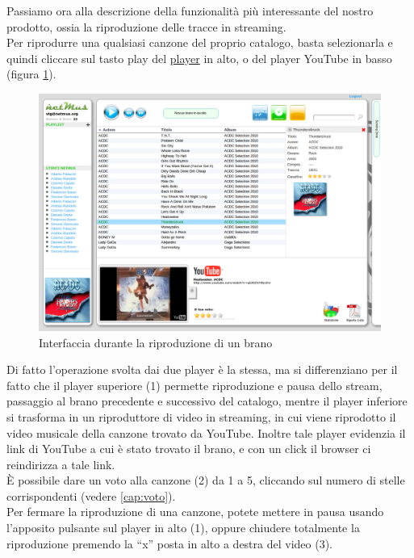 Passiamo ora alla descrizione della funzionalit\`a pi\`u
interessante del nostro prodotto, ossia la riproduzione delle tracce in streaming.\\
Per riprodurre una qualsiasi canzone del proprio catalogo, basta selezionarla e
quindi cliccare sul tasto play del \underline{player} in alto, o del player
YouTube in basso (figura \ref{fig:play}).\\ 
\begin{figure}[!htbp]
  \centering
  \includegraphics[width=14cm]{img/MU/player_youtube.png}
\caption{Interfaccia durante la riproduzione di un brano}
\label{fig:play}
\end{figure} 

Di fatto l'operazione svolta dai due player \`e la stessa, ma
si differenziano per il fatto che il player superiore (1) permette riproduzione
e pausa dello stream, passaggio al brano precedente e successivo del catalogo, mentre il player
inferiore si trasforma in un riproduttore di video in streaming, in cui viene
riprodotto il video musicale della canzone trovato da YouTube.
Inoltre tale player evidenzia il link di YouTube a cui \`e stato trovato il
brano, e con un click il browser ci reindirizza a tale link.\\
\`E possibile dare un voto alla canzone (2) da 1 a 5, cliccando sul numero di
stelle corrispondenti (vedere \ref{cap:voto}).\\

Per fermare la riproduzione di una canzone, potete mettere in pausa usando
l'apposito pulsante sul player in alto (1), oppure chiudere totalmente la
riproduzione premendo la ``x'' posta in alto a destra del video (3).\\

